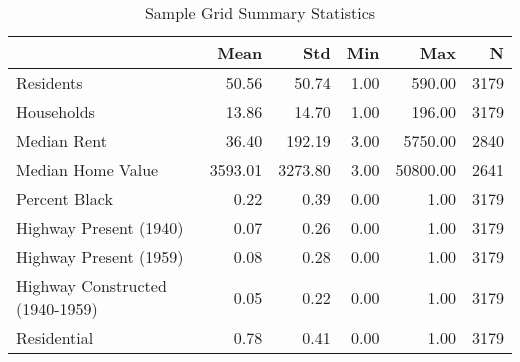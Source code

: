 \begin{table}[h]
\centering
\caption{Sample Grid Summary Statistics}
\label{tab:summary_stats}
\begin{tabular*}{\linewidth}{@{\extracolsep{\fill}}l*{5}{r}}
\toprule
 & Mean & Std & Min & Max & N \\
\midrule
Residents & 50.56 & 50.74 & 1.00 & 590.00 & 3179 \\
Households & 13.86 & 14.70 & 1.00 & 196.00 & 3179 \\
Median Rent & 36.40 & 192.19 & 3.00 & 5750.00 & 2840 \\
Median Home Value & 3593.01 & 3273.80 & 3.00 & 50800.00 & 2641 \\
Percent Black & 0.22 & 0.39 & 0.00 & 1.00 & 3179 \\
Highway Present (1940) & 0.07 & 0.26 & 0.00 & 1.00 & 3179 \\
Highway Present (1959) & 0.08 & 0.28 & 0.00 & 1.00 & 3179 \\
Highway Constructed (1940-1959) & 0.05 & 0.22 & 0.00 & 1.00 & 3179 \\
Residential & 0.78 & 0.41 & 0.00 & 1.00 & 3179 \\
\bottomrule
\end{tabular*}
\end{table}
